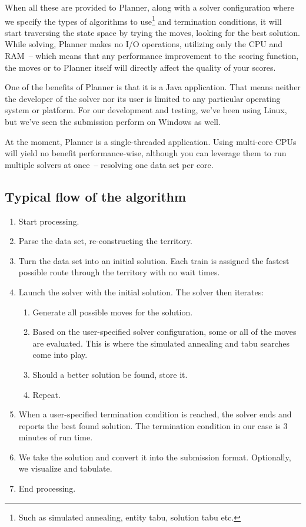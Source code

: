 \documentclass[10pt,a4paper,final]{article}
\begin{document}
When all these are provided to Planner, along with a solver configuration where we specify  the types of algorithms to use\footnote{Such as simulated annealing, entity tabu, solution tabu etc.} and termination conditions, it will start traversing the state space by trying the moves, looking for the best solution. While solving, Planner makes no I/O operations, utilizing only the CPU and RAM~-- which means that any performance improvement to the scoring function, the moves or to Planner itself will directly affect the quality of your scores. 

One of the benefits of Planner is that it is a Java application. That means neither the developer of the solver nor its user is limited to any particular operating system or platform. For our development and testing, we've been using Linux, but we've seen the submission perform on Windows as well.

At the moment, Planner is a single-threaded application. Using multi-core CPUs will yield no benefit performance-wise, although you can leverage them to run multiple solvers at once~-- resolving one data set per core.

\subsection{Typical flow of the algorithm}

\begin{enumerate}
\item Start processing.
\item Parse the data set, re-constructing the territory.
\item Turn the data set into an initial solution. Each train is assigned the fastest possible route through the territory with no wait times. 
\item Launch the solver with the initial solution. The solver then iterates:

\begin{enumerate}
\item Generate all possible moves for the solution.
\item Based on the user-specified solver configuration, some or all of the moves are evaluated. This is where the simulated annealing and tabu searches come into play.
\item Should a better solution be found, store it.
\item Repeat.
\end{enumerate}

\item When a user-specified termination condition is reached, the solver ends and reports the best found solution. The termination condition in our case is 3 minutes of run time.
\item We take the solution and convert it into the submission format. Optionally, we visualize and tabulate.
\item End processing.
\end{enumerate}
\end{document}

